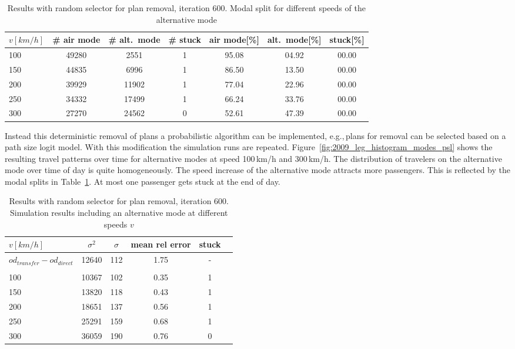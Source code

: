 \begin{table}[t]
	\centering
	\begin{tabular}{@{}l|ccc|ccc@{}}
		$v [km/h]$	& \# air mode  & \# alt.~mode & \# stuck & air mode[\%]  & alt.~mode[\%] & stuck[\%] \\
		\hline 
		100 & 49280 & 2551 & 1 & 95.08 & 04.92 & 00.00\\	%
		150 & 44835 & 6996 & 1 & 86.50 & 13.50 & 00.00\\	%
		200 & 39929 & 11902 & 1 & 77.04 & 22.96 & 00.00\\	%
		250 & 34332 & 17499 & 1 & 66.24 & 33.76 & 00.00\\	%
		300 & 27270 & 24562 & 0 & 52.61 & 47.39 & 00.00\\	%
	\end{tabular}
	\caption{Results with random selector for plan removal, iteration 600. Modal split for different speeds of the alternative mode}
	\label{tab:2009_results_train_modal_split_psl}
\end{table}

Instead this deterministic removal of plans a probabilistic algorithm can be implemented, e.g.,\,plans for removal can be selected based on a path size logit model. 
With this modification the simulation runs are repeated. 
Figure~\ref{fig:2009_leg_histogram_modes_psl} shows the resulting travel patterns over time for alternative modes at speed 100\,km/h and 300\,km/h.  
The distribution of travelers on the alternative mode over time of day is quite homogeneously. 
The speed increase of the alternative mode attracts more passengers. 
This is reflected by the modal splits in Table~\ref{tab:2009_results_train_modal_split_psl}. 
At most one passenger gets stuck at the end of day. 

\begin{table}[t]
\centering
		\begin{tabular}{@{}l|ccccc@{}}
			$v [km/h]$ & $\sigma^2$ & $\sigma$ & mean rel error  & stuck \\
\hline
 $od_{transfer} - od_{direct}$ &  12640 & 112 & 1.75 & - \\
 \\
 100	& 10367 & 102 & %
 0.35%
 &  %
 1
 \\	%
 150	& 13820 & 118 & 0.43 &  1 \\	%
 200 & 18651 & 137 & 0.56 &  1 \\	%
 250 & 25291 & 159 & 0.68 & 1 \\	%
 300 & 36059 & 190 & 0.76 & 0 \\	%
		\end{tabular}
		\caption{Results with random selector for plan removal, iteration 600. Simulation results including an alternative mode at different speeds $v$}
		\label{tab:2009_results_alternative_mode_psl}
\end{table}

